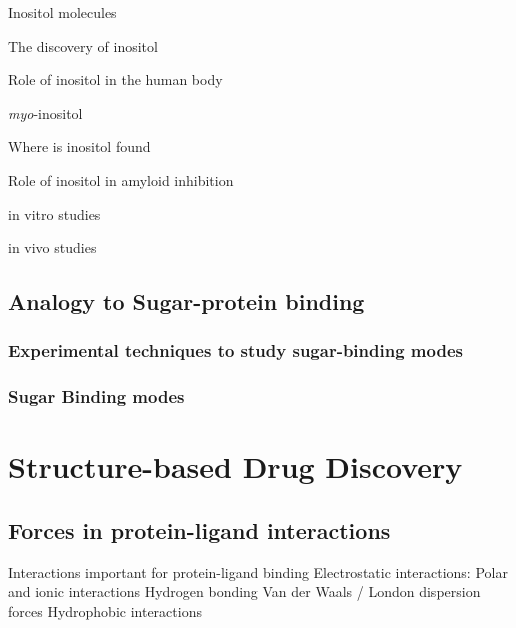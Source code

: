 \begin{outline}[enumerate]
	\1 Inositol molecules
	
		\2 The discovery of inositol
		
		\2 Role of inositol in the human body 
		
			\3 \emph{myo}-inositol
			
		\2 Where is inositol found
		
		\2 Role of inositol in amyloid inhibition
		
			\3 in vitro studies
			
			\3 in vivo studies
\end{outline}

\subsection{Analogy to Sugar-protein binding}
\subsubsection{Experimental techniques to study sugar-binding modes}
\subsubsection{Sugar Binding modes}


\section{Structure-based Drug Discovery}
\subsection{Forces in protein-ligand interactions}
\begin{outline}
	\1 Interactions important for protein-ligand binding
		\2 Electrostatic interactions: Polar and ionic interactions
			\3 Hydrogen bonding
			\3 Van der Waals / London dispersion forces
		\2 Hydrophobic interactions
\end{outline}

